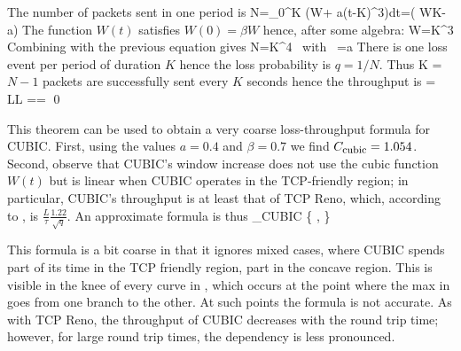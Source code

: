 The number of packets sent in one period is
\ben
   N=\int_0^K \left(W+ a(t-K)^3\right)dt=\left(
   WK-a\right)
\een
The function $W(t)$ satisfies $W(0)=\beta W$ hence, after some algebra:
\ben
W=K^3
\een
Combining with the previous equation gives
\ben
N=\alpha K^4 \mbox{   with } \alpha=a
\een
There is one loss event per period of duration $K$ hence the loss probability is $q=1/N$.
Thus
\ben
K = 
\een
$N-1$ packets are successfully sent every $K$ seconds hence the throughput is
\ben
\theta = L\approx L =\times {}=
\een
\qed

This theorem can be used to obtain a very coarse loss-throughput formula for CUBIC. First, using the values $a=0.4$ and $\beta=0.7$ we find $C_{\footnotesize \mbox{cubic}}=1.054$. Second, observe that CUBIC's window increase does not use the cubic function $W(t)$ but is linear when CUBIC operates in the TCP-friendly region; in particular, CUBIC's throughput is at least that of TCP Reno, which, according to , is $\frac{L}{\tau} \frac{1.22}{\sqrt{q}}$. An approximate formula is thus
\ben
\theta_{\footnotesize \mbox{CUBIC}} \approx \max\left\{ 
   ,
       
      \right\}
\een
 \begin{figure}[h]
        \protect\label{fig-cubict}
\end{figure}


 This formula is a bit coarse in that it ignores mixed cases, where CUBIC spends part of its time in the TCP friendly region, part in the concave region. This is visible in the knee of every curve in , which occurs at the point where the max in  goes from one branch to the other. At such points the formula is not accurate.
As with TCP Reno, the throughput of CUBIC decreases with the round trip time; however, for large round trip times, the dependency is less pronounced.

